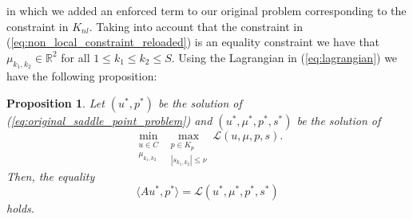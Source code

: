 \documentclass[abstracton]{scrreprt}
\newtheorem{proposition}[theorem]{Proposition}
\begin{document}
        in which we added an enforced term to our original problem corresponding to the constraint in $K_{nl}$. Taking into account that the constraint in (\ref{eq:non_local_constraint_reloaded}) is an equality constraint we have that $\mu_{k_{1}, k_{2}} \in \mathbb{R}^{2}$ for all $1 \le k_{1} \le k_{2} \le S$. Using the Lagrangian in (\ref{eq:lagrangian}) we have the following proposition:
            \begin{proposition}
                \label{prop:equivalence_of_two_problems}
                Let $(u^{\ast}, p^{\ast})$ be the solution of (\ref{eq:original_saddle_point_problem}) and $(u^{\ast}, \mu^{\ast}, p^{\ast}, s^{\ast})$ be the solution of
                    \begin{equation}
                        \min_{\substack{u \in C \\ \mu_{k_{1}, k_{2}}}} \max_{\substack{p \in K_{p} \\ |s_{k_{1}, k_{2}}| \le \nu}} \mathcal{L}(u, \mu, p, s).
                        \label{eq:lagrange_saddle_point_problem}
                    \end{equation}
                Then, the equality
                    \begin{equation}
                        \langle Au^{\ast}, p^{\ast} \rangle = \mathcal{L}(u^{\ast}, \mu^{\ast}, p^{\ast}, s^{\ast})
                        \label{eq:equality_of_problems}
                    \end{equation}
                holds.
            \end{proposition}
\end{document}
